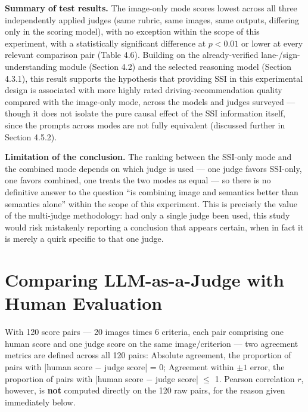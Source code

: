 \documentclass[12pt,a4paper]{report}
\begin{document}
\textbf{Summary of test results.} The image-only mode scores lowest across all three independently applied judges (same rubric, same images, same outputs, differing only in the scoring model), with no exception within the scope of this experiment, with a statistically significant difference at $p<0.01$ or lower at every relevant comparison pair (Table 4.6). Building on the already-verified lane-/sign-understanding module (Section 4.2) and the selected reasoning model (Section 4.3.1), this result supports the hypothesis that providing SSI in this experimental design is associated with more highly rated driving-recommendation quality compared with the image-only mode, across the models and judges surveyed --- though it does not isolate the pure causal effect of the SSI information itself, since the prompts across modes are not fully equivalent (discussed further in Section 4.5.2).

\textbf{Limitation of the conclusion.} The ranking between the SSI-only mode and the combined mode depends on which judge is used --- one judge favors SSI-only, one favors combined, one treats the two modes as equal --- so there is no definitive answer to the question ``is combining image and semantics better than semantics alone'' within the scope of this experiment. This is precisely the value of the multi-judge methodology: had only a single judge been used, this study would risk mistakenly reporting a conclusion that appears certain, when in fact it is merely a quirk specific to that one judge.

\section{Comparing LLM-as-a-Judge with Human Evaluation}

With 120 score pairs --- 20 images times 6 criteria, each pair comprising one human score and one judge score on the same image/criterion --- two agreement metrics are defined across all 120 pairs: Absolute agreement, the proportion of pairs with |human score $-$ judge score| = 0; Agreement within $\pm 1$ error, the proportion of pairs with |human score $-$ judge score| $\le$ 1. Pearson correlation $r$, however, is \textbf{not} computed directly on the 120 raw pairs, for the reason given immediately below.
\end{document}
